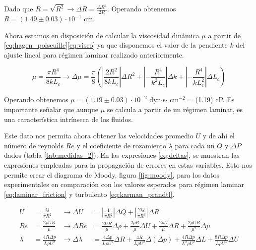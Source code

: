 	\vspace{\baselineskip} 
	
	Dado que $R=\sqrt{R^2}\rightarrow \Delta R = \frac{\Delta R^2}{2R}$. Operando obtenemos $R = (1.49\pm0.03)\cdot10^{-1}$ cm.
	
	\vspace{\baselineskip} 
	Ahora estamos en disposición de calcular la viscosidad dinámica $\mu$ a partir de \ref{eq:hagen_poiseuille}\ref{eq:visco} ya que disponemos el valor de la pendiente $k$ del ajuste lineal para régimen laminar realizado anteriormente.
	

	\begin{equation}\label{eq:visco}
		\mu=\frac{\pi R^4}{8kL_c} \rightarrow \Delta \mu =  \frac{\pi}{8}\left(\left|\frac{2R^2}{8kL_c}\right|\Delta R^2 + \left|-\frac{R^4}{k^2L_c}\right|\Delta k + \left|-\frac{R^4}{kL_c^2}\right|\Delta L_c\right)
	\end{equation}
	
	Operando obtenemos $\mu= (1.19\pm0.03)\cdot10^{-2}$ dyn$\cdot$s$\cdot$ cm$^{-2}$ = (1.19) cP. Es importante señalar que aunque $\mu$ se calcula a partir de un régimen laminar, es una característica intrínseca de los fluidos.
	
    \vspace{\baselineskip} 
	Este dato nos permita ahora obtener las velocidades promedio $U$ y de ahí el número de reynolds $Re$ y  el coeficiente de rozamiento $\lambda$ para cada un $Q$ y $\Delta P$ dados (tabla \ref{tab:medidas_2}). En las expresiones \ref{eq:deltas}, se muestran las expresiones empleadas para la propagación de errores en estas variables. Esto nos permite crear el diagrama de Moody, figura \ref{fig:moody}, para los datos experimentales en comparación con los valores esperados para régimen laminar \ref{eq:laminar_friction} y turbulento \ref{eq:karman_prandtl}.
	
	
	
	\begin{equation}\label{eq:deltas}
		\begin{aligned}
			U &= \frac{Q}{\pi R^2} & \rightarrow \Delta U &= \left|\frac{1}{\pi R^2}\right| \Delta Q + \left|\frac{2Q}{\pi R^3}\right| \Delta R \\
			Re &= \frac{2 \rho U R}{\mu} & \rightarrow \Delta Re &= \frac{2UR}{\mu}\Delta \rho + \frac{2\rho R}{\mu}\Delta U + \frac{2\rho U}{\mu}\Delta R + \frac{2\rho UR}{\mu^2}\Delta \mu \\
			\lambda &= \frac{4 R \Delta p}{L \rho U^2} & \rightarrow \Delta \lambda &= \frac{4\Delta p}{L\rho U^2}\Delta R + \frac{4R}{L\rho U^2}\Delta(\Delta p) + \frac{4R\Delta p}{L^2\rho U^2}\Delta L  + \frac{8R\Delta p}{L\rho U^3}\Delta U
		\end{aligned}
	\end{equation}
	
